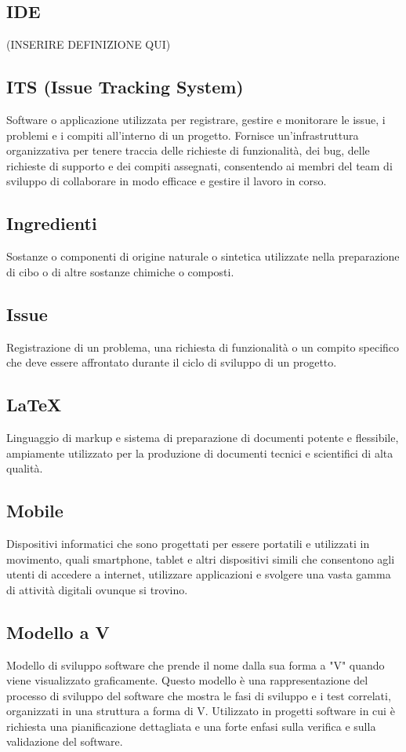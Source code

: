 \subsection{IDE} (INSERIRE DEFINIZIONE QUI)
\subsection{ITS (Issue Tracking System)}Software o applicazione utilizzata per registrare, gestire e monitorare le issue, i problemi e i compiti all'interno di un progetto. Fornisce un'infrastruttura organizzativa per tenere traccia delle richieste di funzionalità, dei bug, delle richieste di supporto e dei compiti assegnati, consentendo ai membri del team di sviluppo di collaborare in modo efficace e gestire il lavoro in corso.
\subsection{Ingredienti}Sostanze o componenti di origine naturale o sintetica utilizzate nella preparazione di cibo o di altre sostanze chimiche o composti.
\subsection{Issue}Registrazione di un problema, una richiesta di funzionalità o un compito specifico che deve essere affrontato durante il ciclo di sviluppo di un progetto.
\subsection{LaTeX}Linguaggio di markup e sistema di preparazione di documenti potente e flessibile, ampiamente utilizzato per la produzione di documenti tecnici e scientifici di alta qualità.
\subsection{Mobile}Dispositivi informatici che sono progettati per essere portatili e utilizzati in movimento, quali smartphone, tablet e altri dispositivi simili che consentono agli utenti di accedere a internet, utilizzare applicazioni e svolgere una vasta gamma di attività digitali ovunque si trovino.
\subsection{Modello a V}Modello di sviluppo software che prende il nome dalla sua forma a "V" quando viene visualizzato graficamente. Questo modello è una rappresentazione del processo di sviluppo del software che mostra le fasi di sviluppo e i test correlati, organizzati in una struttura a forma di V. Utilizzato in progetti software in cui è richiesta una pianificazione dettagliata e una forte enfasi sulla verifica e sulla validazione del software.
